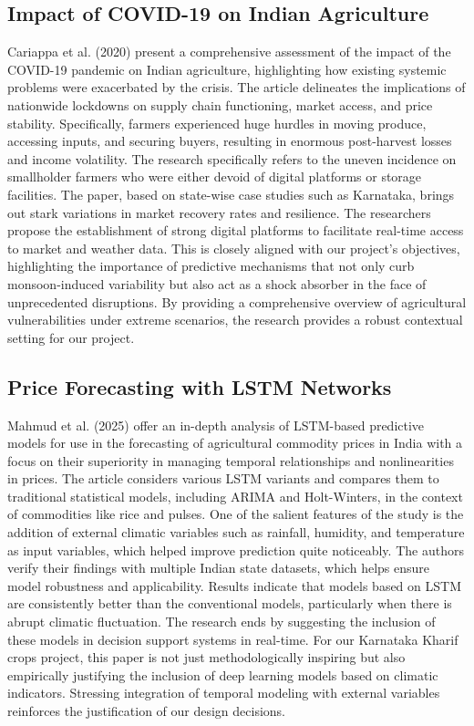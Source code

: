 \subsection{Impact of COVID-19 on Indian Agriculture \cite{cariappa2020impact}}
Cariappa et al. (2020) present a comprehensive assessment of the impact of the COVID-19 pandemic on Indian agriculture, highlighting how existing systemic problems were exacerbated by the crisis. The article delineates the implications of nationwide lockdowns on supply chain functioning, market access, and price stability. Specifically, farmers experienced huge hurdles in moving produce, accessing inputs, and securing buyers, resulting in enormous post-harvest losses and income volatility. The research specifically refers to the uneven incidence on smallholder farmers who were either devoid of digital platforms or storage facilities. The paper, based on state-wise case studies such as Karnataka, brings out stark variations in market recovery rates and resilience. The researchers propose the establishment of strong digital platforms to facilitate real-time access to market and weather data. This is closely aligned with our project's objectives, highlighting the importance of predictive mechanisms that not only curb monsoon-induced variability but also act as a shock absorber in the face of unprecedented disruptions. By providing a comprehensive overview of agricultural vulnerabilities under extreme scenarios, the research provides a robust contextual setting for our project.

\subsection{Price Forecasting with LSTM Networks \cite{mahmud2025price}}
Mahmud et al. (2025) offer an in-depth analysis of LSTM-based predictive models for use in the forecasting of agricultural commodity prices in India with a focus on their superiority in managing temporal relationships and nonlinearities in prices. The article considers various LSTM variants and compares them to traditional statistical models, including ARIMA and Holt-Winters, in the context of commodities like rice and pulses. One of the salient features of the study is the addition of external climatic variables such as rainfall, humidity, and temperature as input variables, which helped improve prediction quite noticeably. The authors verify their findings with multiple Indian state datasets, which helps ensure model robustness and applicability. Results indicate that models based on LSTM are consistently better than the conventional models, particularly when there is abrupt climatic fluctuation. The research ends by suggesting the inclusion of these models in decision support systems in real-time. For our Karnataka Kharif crops project, this paper is not just methodologically inspiring but also empirically justifying the inclusion of deep learning models based on climatic indicators. Stressing integration of temporal modeling with external variables reinforces the justification of our design decisions.

